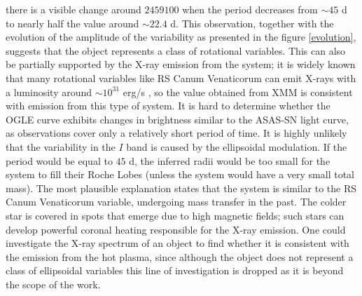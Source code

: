 \documentclass{pracalicmgr}
\begin{document}
there is a visible change around $2459100$ when the period decreases from $\sim 45$ d to nearly half the value around $\sim22.4$ d.
This observation, together with the evolution of the amplitude of the variability as presented in the figure \ref{evolution},
suggests that the object represents a class of rotational variables.
This can also be partially supported by the X-ray emission from the system; it is widely known that many rotational variables like RS Canum Venaticorum can
emit X-rays with a luminosity around $\sim 10^{31}$ erg/s \citep{walter_x-rays_1980}, so the value obtained from XMM 
is consistent with emission from this type of system. It is hard to determine whether the OGLE curve exhibits changes in brightness similar to the ASAS-SN light curve,
as observations cover only a relatively short period of time. 
It is highly unlikely that the variability in the $I$ band is caused by the ellipsoidal modulation.
If the period would be equal to $45$ d, the inferred radii would be too small for the system to fill their Roche Lobes (unless the system would have a very small total mass).
The most plausible explanation states that the system is similar to the RS Canum Venaticorum variable, undergoing mass transfer in the past.
The colder star is covered in spots that emerge due to high magnetic fields; such stars can develop powerful coronal heating responsible for the X-ray emission.
One could investigate the X-ray spectrum of an object to find whether it is consistent with the emission from the hot plasma,
since although the object does not represent a class of ellipsoidal variables this line of investigation is dropped as it is beyond the 
scope of the work.
\end{document}
